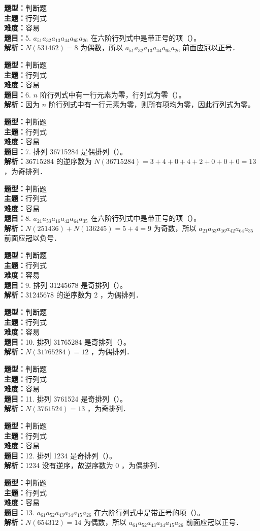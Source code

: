 \documentclass{ctexart}
\newenvironment{question}[5]{%
	\noindent\textbf{题型：}#1\\
	\textbf{主题：}#2\\
	\textbf{难度：}#3\\
	\textbf{题目：}#4\\
	\textbf{解析：}#5\\
	\vspace{1em}
}{}
\begin{document}
	\begin{question}
		{判断题}
		{行列式}
		{容易}
		{5. $a_{51} a_{32} a_{13} a_{44} a_{65} a_{26}$ 在六阶行列式中是带正号的项（）。}
		{$N(531462)=8$ 为偶数，所以 $a_{51} a_{32} a_{13} a_{44} a_{65} a_{26}$ 前面应冠以正号．}
	\end{question}
	
	\begin{question}
		{判断题}
		{行列式}
		{容易}
		{6. $n$ 阶行列式中有一行元素为零，行列式为零（）。}
		{因为 $n$ 阶行列式中有一行元素为零，则所有项均为零，因此行列式为零。}
	\end{question}
	
	\begin{question}
		{判断题}
		{行列式}
		{容易}
		{7. 排列 36715284 是偶排列（）。}
		{36715284 的逆序数为 $N(36715284)=3+4+0+4+2+0+0+0=13$ ，为奇排列．}
	\end{question}
	
	\begin{question}
		{判断题}
		{行列式}
		{容易}
		{8. $a_{21} a_{53} a_{16} a_{42} a_{64} a_{35}$ 在六阶行列式中是带正号的项（）。}
		{$N(251436)+N(136245)=5+4=9$ 为奇数，所以 $a_{21} a_{53} a_{16} a_{42} a_{64} a_{35}$ 前面应冠以负号．}
	\end{question}
	
	\begin{question}
		{判断题}
		{行列式}
		{容易}
		{9. 排列 31245678 是奇排列（）。}
		{31245678 的逆序数为 2 ，为偶排列．}
	\end{question}
	
	\begin{question}
		{判断题}
		{行列式}
		{容易}
		{10. 排列 31765284 是奇排列（）。}
		{$N(31765284)=12$ ，为偶排列．}
	\end{question}
	
	\begin{question}
		{判断题}
		{行列式}
		{容易}
		{11. 排列 3761524 是奇排列（）。}
		{$N(3761524)=13$ ，为奇排列．}
	\end{question}
	
	\begin{question}
		{判断题}
		{行列式}
		{容易}
		{12. 排列 1234 是奇排列（）。}
		{1234 没有逆序，故逆序数为 0 ，为偶排列．}
	\end{question}
	
	\begin{question}
		{判断题}
		{行列式}
		{容易}
		{13. $a_{61} a_{52} a_{43} a_{34} a_{15} a_{26}$ 在六阶行列式中是带正号的项（）。}
		{$N(654312)=14$ 为偶数，所以 $a_{61} a_{52} a_{43} a_{34} a_{15} a_{26}$ 前面应冠以正号．}
	\end{question}
	
\end{document}
